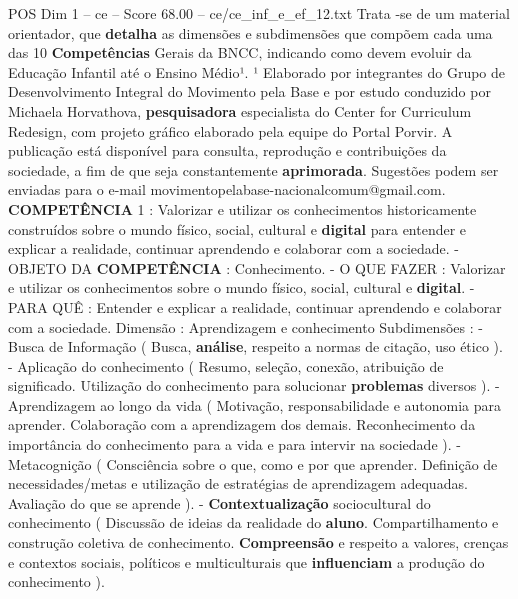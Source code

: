 \begin{textsample}{POS Dim 1 – ce – Score 68.00 – ce/ce\_inf\_e\_ef\_12.txt}
Trata -se de um material orientador, que \textbf{detalha} as dimensões e subdimensões que compõem cada uma das 10 \textbf{Competências} Gerais da BNCC, indicando como devem evoluir da Educação Infantil até o Ensino Médio¹. ¹ Elaborado por integrantes do Grupo de Desenvolvimento Integral do Movimento pela Base e por estudo conduzido por Michaela Horvathova, \textbf{pesquisadora} especialista do Center for Curriculum Redesign, com projeto gráfico elaborado pela equipe do Portal Porvir.
A publicação está disponível para consulta, reprodução e contribuições da sociedade, a fim de que seja constantemente \textbf{aprimorada}.
Sugestões podem ser enviadas para o e-mail movimentopelabase-nacionalcomum@gmail.com. \textbf{COMPETÊNCIA} 1 : Valorizar e utilizar os conhecimentos historicamente construídos sobre o mundo físico, social, cultural e \textbf{digital} para entender e explicar a realidade, continuar aprendendo e colaborar com a sociedade. - OBJETO DA \textbf{COMPETÊNCIA} : Conhecimento. - O QUE FAZER : Valorizar e utilizar os conhecimentos sobre o mundo físico, social, cultural e \textbf{digital}. - PARA QUÊ : Entender e explicar a realidade, continuar aprendendo e colaborar com a sociedade.
Dimensão : Aprendizagem e conhecimento Subdimensões : - Busca de Informação ( Busca, \textbf{análise}, respeito a normas de citação, uso ético ). - Aplicação do conhecimento ( Resumo, seleção, conexão, atribuição de significado.
Utilização do conhecimento para solucionar \textbf{problemas} diversos ). - Aprendizagem ao longo da vida ( Motivação, responsabilidade e autonomia para aprender.
Colaboração com a aprendizagem dos demais.
Reconhecimento da importância do conhecimento para a vida e para intervir na sociedade ). - Metacognição ( Consciência sobre o que, como e por que aprender.
Definição de necessidades/metas e utilização de estratégias de aprendizagem adequadas.
Avaliação do que se aprende ). - \textbf{Contextualização} sociocultural do conhecimento ( Discussão de ideias da realidade do \textbf{aluno}.
Compartilhamento e construção coletiva de conhecimento. \textbf{Compreensão} e respeito a valores, crenças e contextos sociais, políticos e multiculturais que \textbf{influenciam} a produção do conhecimento ).

\end{textsample}
